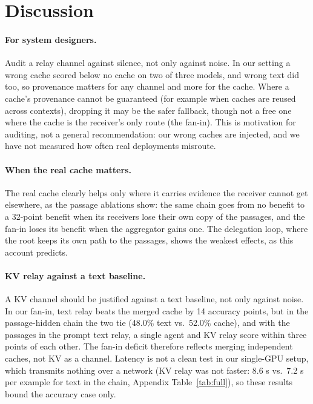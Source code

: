 \documentclass[11pt]{article}
\begin{document}
\section{Discussion}

\paragraph{For system designers.} Audit a relay channel against silence,
not only against noise. In our setting a wrong cache scored below no cache on two
of three models, and wrong text did too, so provenance matters for any channel and
more for the cache. Where a cache's provenance cannot be guaranteed (for example
when caches are reused across contexts), dropping it may be the safer fallback,
though not a free one where the cache is the receiver's only route (the fan-in).
This is motivation for auditing, not a general recommendation: our wrong caches
are injected, and we have not measured how often real deployments misroute.

\paragraph{When the real cache matters.} The real cache clearly helps
only where it carries evidence the receiver cannot get elsewhere, as the
passage ablations show: the same chain goes from no benefit to a 32-point benefit
when its receivers lose their own copy of the passages, and the fan-in loses its
benefit when the aggregator gains one. The delegation loop, where
the root keeps its own path to the passages, shows the weakest effects, as this
account predicts.

\paragraph{KV relay against a text baseline.} A KV channel should be
justified against a text baseline, not only against noise. In our fan-in, text
relay beats the merged cache by 14 accuracy points, but in the passage-hidden chain
the two tie (48.0\% text vs.\ 52.0\% cache), and with the passages in the prompt
text relay, a single agent and KV relay score within three points of each other.
The fan-in deficit therefore reflects merging independent caches, not KV as a
channel. Latency is
not a clean test in our single-GPU setup, which transmits nothing over a network
(KV relay was not faster: 8.6 s vs.\ 7.2 s per example for text in the chain,
Appendix Table~\ref{tab:full}), so these results bound the accuracy case only.
\end{document}
